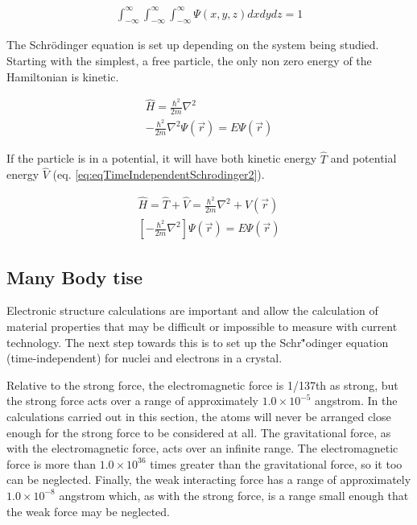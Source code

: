 \begin{equation}
\begin{split}
\int_{-\infty}^{\infty} \int_{-\infty}^{\infty}  \int_{-\infty}^{\infty}  \Psi(x,y,z) dx dy dz = 1
\end{split}
\label{eq:foundsomewhere}
\end{equation}

The Schr\"{o}dinger equation is set up depending on the system being studied.  Starting with the simplest, a free particle, the only non zero energy of the Hamiltonian is kinetic.


\begin{equation}
\begin{split}
\hat{H} = \frac{\hbar^2}{2 m} \nabla^2 \\
-\frac{\hbar^2}{2 m} \nabla^2 \Psi(\vec{r}) = E \Psi(\vec{r})
\end{split}
\label{eq:eqTimeIndependentSchrodinger1}
\end{equation}

If the particle is in a potential, it will have both kinetic energy $\hat{T}$ and potential energy $\hat{V}$ (eq. \ref{eq:eqTimeIndependentSchrodinger2}).

\begin{equation}
\begin{split}
\hat{H} = \hat{T} + \hat{V} = \frac{\hbar^2}{2 m} \nabla^2 + V(\vec{r})\\
\left[-\frac{\hbar^2}{2 m} \nabla^2 \right] \Psi(\vec{r}) = E \Psi(\vec{r})
\end{split}
\label{eq:eqTimeIndependentSchrodinger2}
\end{equation}




\subsection{Many Body \acrshort{tise}}

Electronic structure calculations are important and allow the calculation of material properties that may be difficult or impossible to measure with current technology.  The next step towards this is to set up the Schr\""{o}dinger equation (time-independent) for nuclei and electrons in a crystal.  

Relative to the strong force, the electromagnetic force is 1/137th as strong, but the strong force acts over a range of approximately $1.0 \times 10^{-5}$ angstrom.  In the calculations carried out in this section, the atoms will never be arranged close enough for the strong force to be considered at all.  The gravitational force, as with the electromagnetic force, acts over an infinite range.  The electromagnetic force is more than $1.0 \times 10^{36}$ times greater than the gravitational force, so it too can be neglected.  Finally, the weak interacting force has a range of approximately $1.0 \times 10^{-8}$ angstrom which, as with the strong force, is a range small enough that the weak force may be neglected.

